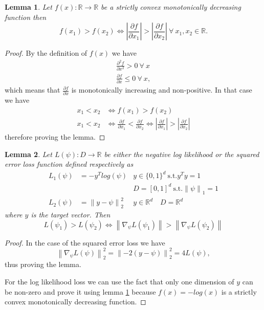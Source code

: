 \documentclass{article}
\newcommand{\norm}[1]{\left\lVert #1 \right\rVert}
\newcommand{\abs}[1]{\left| #1 \right|}
\newcommand{\diff}[2]{\frac{\partial #1}{\partial #2}}
\newcommand{\ddiff}[2]{\frac{\partial^2 #1}{\partial #2^2}}
\newtheorem{lemma}{Lemma}
\begin{document}
\begin{lemma} \label{lem:convex_order}
Let $f(x): \mathbb{R} \to \mathbb{R}$ be a strictly convex monotonically
decreasing function then
\begin{equation}
f(x_1) > f(x_2) \iff \abs{\diff{f}{x_1}} > \abs{\diff{f}{x_2}} \ \forall \ x_1, x_2 \in
\mathbb{R}.
\end{equation}
\end{lemma}

\begin{proof}
By the definition of $f(x)$ we have
\begin{align}
\ddiff{f}{x} > 0 \ \forall \ x \\
\diff{f}{x} \leq 0 \ \forall \ x,
\end{align}
which means that $\diff{f}{x}$ is monotonically increasing and non-positive. In
that case we have
\begin{align}
x_1 < x_2 & \iff f(x_1) > f(x_2) \\
x_1 < x_2 & \iff \diff{f}{x_1} < \diff{f}{x_2} \iff \abs{\diff{f}{x_1}} > \abs{\diff{f}{x_2}}
\end{align}
therefore proving the lemma.
\end{proof}

\begin{lemma} \label{lem:loss_order}
Let $L(\psi) : D \to \mathbb{R}$ be either the negative log
likelihood or the squared error loss function defined respectively as
\begin{equation}
\begin{aligned}
L_1(\psi) & = - y^T log(\psi) & y \in \{0, 1\}^d \ \text{s.t.} y^T y = 1 \\
    & & D=[0, 1]^d \ \text{s.t.} \norm{\psi}_1 = 1 \\
L_2(\psi) & = \norm{y - \psi}_2^2 & y \in \mathbb{R}^d \quad
    D=\mathbb{R}^d
\end{aligned}
\end{equation}
where $y$ is the target vector. Then
\begin{equation}
L(\psi_1) > L(\psi_2) \iff \norm{\nabla_{\psi} L(\psi_1)} > \norm{\nabla_{\psi} L(\psi_2)}
\end{equation}
\end{lemma}

\begin{proof}
In the case of the squared error loss we have
\begin{equation}
\norm{\nabla_{\psi} L(\psi)}_2^2
     = \norm{-2 (y - \psi)}_2^2
     = 4 L(\psi),
\end{equation}
thus proving the lemma.

For the log likelihood loss we can use the fact that only one dimension of $y$
can be non-zero and prove it using lemma \ref{lem:convex_order} because
$f(x) = -log(x)$ is a strictly convex monotonically decreasing function.
\end{proof}
\end{document}
